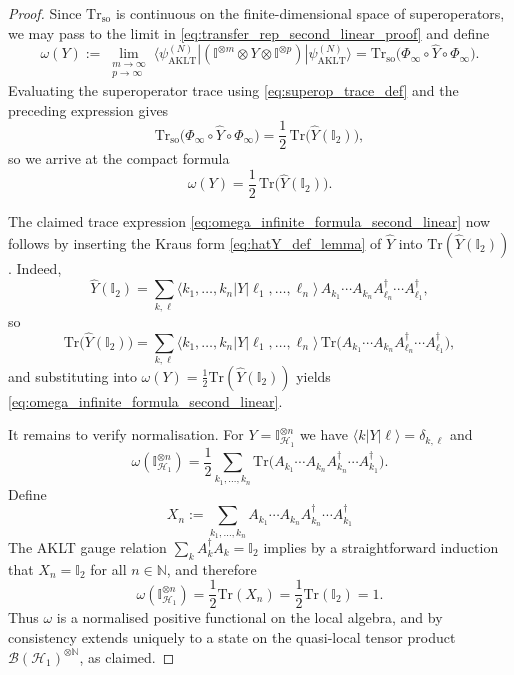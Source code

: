 \documentclass[11pt,a4paper]{article}
\def\Tr{\mathrm{Tr}}
\begin{document}
\begin{proof}
Since \(\Tr_{\mathrm{so}}\) is continuous on the finite-dimensional space of superoperators, we may pass to the limit in \eqref{eq:transfer_rep_second_linear_proof} and define
\[
\omega(Y)
:=
\lim_{\substack{m\to\infty\\ p\to\infty}}
\langle\psi_{\mathrm{AKLT}}^{(N)}|
(\mathbb{I}^{\otimes m}\otimes Y\otimes\mathbb{I}^{\otimes p})
|\psi_{\mathrm{AKLT}}^{(N)}\rangle
=
\Tr_{\mathrm{so}}\!\bigl(\Phi_{\infty}\circ\widehat{Y}\circ\Phi_{\infty}\bigr).
\]
Evaluating the superoperator trace using \eqref{eq:superop_trace_def} and the preceding expression gives
\[
\Tr_{\mathrm{so}}\!\bigl(\Phi_{\infty}\circ\widehat{Y}\circ\Phi_{\infty}\bigr)
=
\frac{1}{2}\,\Tr\!\bigl(\widehat{Y}(\mathbb{I}_2)\bigr),
\]
so we arrive at the compact formula
\[
\omega(Y)=\frac{1}{2}\,\Tr\!\bigl(\widehat{Y}(\mathbb{I}_2)\bigr).
\]

The claimed trace expression \eqref{eq:omega_infinite_formula_second_linear} now follows by inserting the Kraus form \eqref{eq:hatY_def_lemma} of \(\widehat{Y}\) into \(\Tr(\widehat{Y}(\mathbb{I}_2))\). Indeed,
\[
\widehat{Y}(\mathbb{I}_2)
=
\sum_{k,\ell}
\langle k_1,\dots,k_n|Y|\ell_1,\dots,\ell_n\rangle\,
A_{k_1}\cdots A_{k_n}A_{\ell_n}^{\dagger}\cdots A_{\ell_1}^{\dagger},
\]
so
\[
\Tr\!\bigl(\widehat{Y}(\mathbb{I}_2)\bigr)
=
\sum_{k,\ell}
\langle k_1,\dots,k_n|Y|\ell_1,\dots,\ell_n\rangle\,
\Tr\!\bigl(A_{k_1}\cdots A_{k_n}A_{\ell_n}^{\dagger}\cdots A_{\ell_1}^{\dagger}\bigr),
\]
and substituting into \(\omega(Y)=\tfrac{1}{2}\Tr(\widehat{Y}(\mathbb{I}_2))\) yields \eqref{eq:omega_infinite_formula_second_linear}.

It remains to verify normalisation. For \(Y=\mathbb{I}_{\mathcal{H}_{1}}^{\otimes n}\) we have \(\langle k|Y|\ell\rangle=\delta_{k,\ell}\) and
\[
\omega(\mathbb{I}_{\mathcal{H}_{1}}^{\otimes n})
=
\frac{1}{2}\sum_{k_1,\dots,k_n}
\Tr\!\bigl(A_{k_1}\cdots A_{k_n}A_{k_n}^{\dagger}\cdots A_{k_1}^{\dagger}\bigr).
\]
Define
\[
X_n
:=
\sum_{k_1,\dots,k_n}
A_{k_1}\cdots A_{k_n}A_{k_n}^{\dagger}\cdots A_{k_1}^{\dagger}
\]
The AKLT gauge relation \(\sum_k A_k^{\dagger}A_k=\mathbb{I}_2\) implies by a straightforward induction that \(X_n=\mathbb{I}_2\) for all \(n\in\mathbb{N}\), and therefore
\[
\omega(\mathbb{I}_{\mathcal{H}_{1}}^{\otimes n})
=
\frac{1}{2}\Tr(X_n)
=
\frac{1}{2}\Tr(\mathbb{I}_2)
=
1.
\]
Thus \(\omega\) is a normalised positive functional on the local algebra, and by consistency extends uniquely to a state on the quasi-local tensor product \(\mathcal{B}(\mathcal{H}_{1})^{\otimes\mathbb{N}}\), as claimed.
\end{proof}
\end{document}
